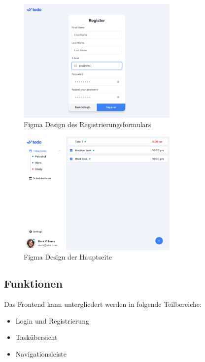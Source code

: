 \documentclass[a4paper, 12pt]{article}
\begin{document}
    \begin{figure}[H]
        \center\includegraphics[width=0.7\textwidth]{../images/figma/register}
        \caption{Figma Design des Registrierungsformulars}\label{fig:figure}
    \end{figure}

    \begin{figure}[H]
        \center\includegraphics[width=0.7\textwidth]{../images/figma/main}
        \caption{Figma Design der Hauptseite}\label{fig:figure}
    \end{figure}

    \subsection{Funktionen}
    Das Frontend kann untergliedert werden in folgende Teilbereiche:

    \begin{itemize}
        \item Login und Registrierung
        \item Taskübersicht
        \item Navigationsleiste
    \end{itemize}
\end{document}
